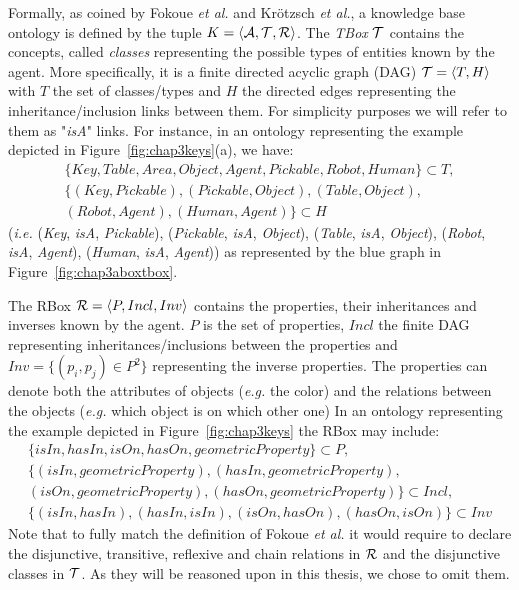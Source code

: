 \documentclass[a4paper,11pt,twoside]{StyleThese}
\begin{document}
Formally, as coined by Fokoue \textit{et al.} \cite{fokoue2006summary} and Kr\"otzsch \textit{et al.}, a knowledge base ontology is defined by the tuple $K = \langle \mathcal{A}, \mathcal{T}, \mathcal{R} \rangle$. 
The \textit{TBox} $\mathcal{T}$ contains the concepts, called \textit{classes} representing the possible types of entities known by the agent. More specifically, it is a finite directed acyclic graph (DAG) $\mathcal{T} = \langle T, H \rangle$ with $T$ the set of classes/types and $H$ the directed edges representing the inheritance/inclusion links between them. For simplicity purposes we will refer to them as "\textit{isA}" links. For instance, in an ontology representing the example depicted in Figure~\ref{fig:chap3keys}(a), we have: 
\begin{multline*}
\{Key, Table, Area, Object, Agent, Pickable, Robot, Human\} \subset T,\\
\{(Key, Pickable), (Pickable, Object), (Table, Object),\\
(Robot, Agent), (Human, Agent)\} \subset H
\end{multline*}
(\textit{i.e.} (\textit{Key}, \textit{isA}, \textit{Pickable}), (\textit{Pickable}, \textit{isA}, \textit{Object}), (\textit{Table}, \textit{isA}, \textit{Object}), (\textit{Robot}, \textit{isA}, \textit{Agent}), (\textit{Human}, \textit{isA}, \textit{Agent})) as represented by the blue graph in Figure~\ref{fig:chap3aboxtbox}.

The RBox $\mathcal{R} = \langle P, Incl, Inv \rangle$ contains the properties, their inheritances and inverses known by the agent. $P$ is the set of properties, $Incl$ the finite DAG representing inheritances/inclusions between the properties and $Inv = \{(p_i, p_j) \in P^2\}$ representing the inverse properties. The properties can denote both the attributes of objects (\textit{e.g.} the color) and the relations between the objects (\textit{e.g.} which object is on which other one) In an ontology representing the example depicted in Figure~\ref{fig:chap3keys} the RBox may include: 
\begin{multline*}
\{isIn, hasIn, isOn, hasOn, geometricProperty\} \subset P,\\
\{(isIn, geometricProperty), (hasIn, geometricProperty),\\
(isOn, geometricProperty), (hasOn, geometricProperty)\} \subset Incl,\\
\{(isIn, hasIn), (hasIn, isIn), (isOn, hasOn), (hasOn, isOn)\} \subset Inv
\end{multline*}
Note that to fully match the definition of Fokoue \textit{et al.} \cite{fokoue2006summary} it would require to declare the disjunctive, transitive, reflexive and chain relations in $\mathcal{R}$ and the disjunctive classes in $\mathcal{T}$. As they will be reasoned upon in this thesis, we chose to omit them.
\end{document}
